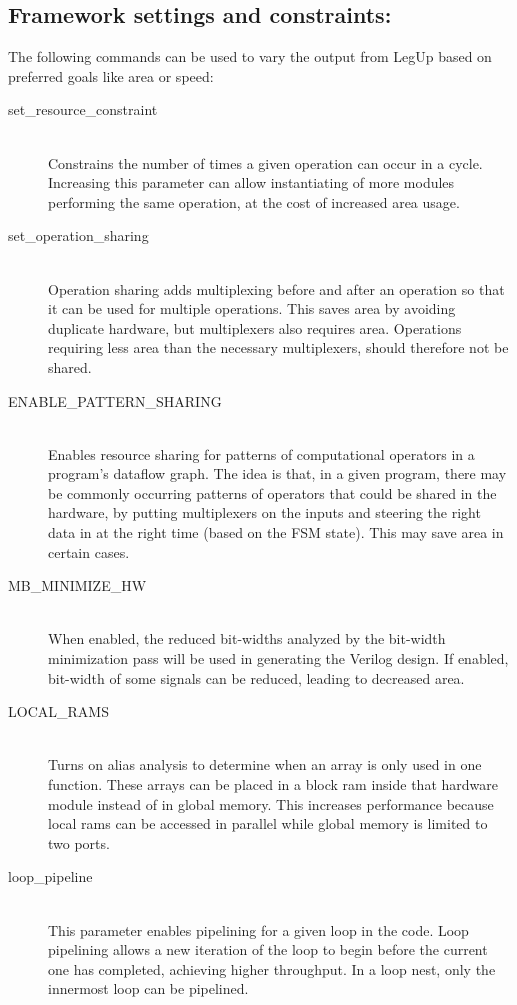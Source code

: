 \subsection{Framework settings and constraints:}
The following commands can be used to vary the output from LegUp based on preferred goals like area or speed:
\begin{description}
  \item[set\_resource\_constraint] \hfill \\
      Constrains the number of times a given operation can occur in a cycle. Increasing this parameter can allow instantiating of more modules performing the same operation, at the cost of increased area usage. 
  \item[set\_operation\_sharing] \hfill \\
      Operation sharing adds multiplexing before and after an operation so that it can be used for multiple operations. This saves area by avoiding duplicate hardware, but multiplexers also requires area. Operations requiring less area than the necessary multiplexers, should therefore not be shared.
  \item[ENABLE\_PATTERN\_SHARING] \hfill \\
      Enables resource sharing for patterns of computational operators in a program’s dataflow graph. The idea is that, in a given program, there may be commonly occurring patterns of operators that could be shared in the hardware, by putting multiplexers on the inputs and steering the right data in at the right time (based on the FSM state). This may save area in certain cases. \cite{hadjis2012impact}
  \item[MB\_MINIMIZE\_HW] \hfill \\
      When enabled, the reduced bit-widths analyzed by the bit-width minimization pass will be used in generating the Verilog design. If enabled, bit-width of some signals can be reduced, leading to decreased area.
  \item[LOCAL\_RAMS] \hfill \\
      Turns on alias analysis to determine when an array is only used in one function. These arrays can be placed in a block ram inside that hardware module instead of in global memory. This increases performance because local rams can be accessed in parallel while global memory is limited to two ports.
  \item[loop\_pipeline] \hfill \\
     This parameter enables pipelining for a given loop in the code. Loop pipelining allows a new iteration of the loop to begin before the current one has completed, achieving higher throughput. In a loop nest, only the innermost loop can be pipelined.
\end{description}
